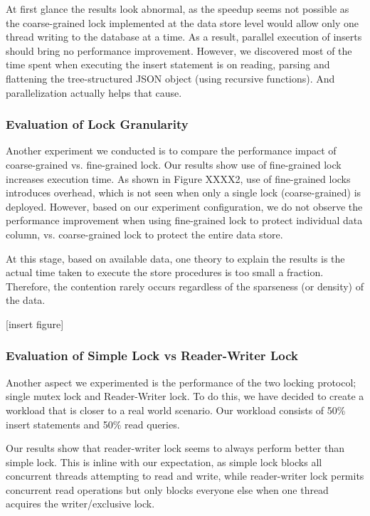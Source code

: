 \documentclass[11pt,journal,compsoc]{IEEEtran}
\begin{document}
At first glance the results look abnormal, as the speedup seems not possible as the coarse-grained lock implemented at the data store level would allow only one thread writing to the database at a time. As a result, parallel execution of inserts should bring no performance improvement. However, we discovered most of the time spent when executing the insert statement is on reading, parsing and flattening the tree-structured JSON object (using recursive functions). And parallelization actually helps that cause.


\subsubsection{Evaluation of Lock Granularity}

Another experiment we conducted is to compare the performance impact of coarse-grained vs. fine-grained lock. Our results show use of fine-grained lock increases execution time. As shown in Figure XXXX2, use of fine-grained locks introduces overhead, which is not seen when only a single lock (coarse-grained) is deployed. However, based on our experiment configuration, we do not observe the performance improvement when using fine-grained lock to protect individual data column, vs. coarse-grained lock to protect the entire data store.
 
At this stage, based on available data, one theory to explain the results is the actual time taken to execute the store procedures is too small a fraction. Therefore, the contention rarely occurs regardless of the sparseness (or density) of the data.


[insert figure]


\subsubsection{Evaluation of Simple Lock vs Reader-Writer Lock}
Another aspect we experimented is the performance of the two locking protocol; single mutex lock and Reader-Writer lock. To do this, we have decided to create a workload that is closer to a real world scenario. Our workload consists of 50\% insert statements and 50\% read queries.

Our results show that reader-writer lock seems to always perform better than simple lock. This is inline with our expectation, as simple lock blocks all concurrent threads attempting to read and write, while reader-writer lock permits concurrent read operations but only blocks everyone else when one thread acquires the writer/exclusive lock.
\end{document}

